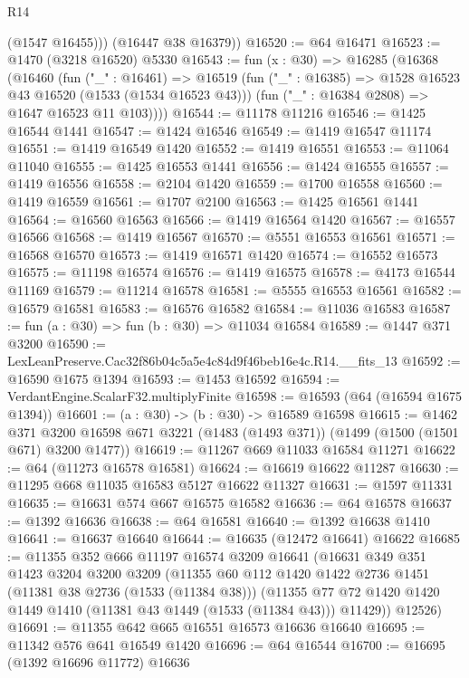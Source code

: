\begin{lexlean}{R14}
\begin{coremodule}
          (@1547 @16455)))
      (@16447 @38 @16379))
@16520 := @64 @16471
@16523 := @1470 (@3218 @16520) @5330
@16543 := fun (x : @30) =>
  @16285
    (@16368
      (@16460
        (fun ("_" : @16461) =>
        @16519
          (fun ("_" : @16385) => @1528 @16523 @43 @16520 (@1533 (@1534 @16523 @43)))
          (fun ("_" : @16384 @2808) => @1647 @16523 @11 @103))))
@16544 := @11178 @11216
@16546 := @1425 @16544 @1441
@16547 := @1424 @16546
@16549 := @1419 @16547 @11174
@16551 := @1419 @16549 @1420
@16552 := @1419 @16551
@16553 := @11064 @11040
@16555 := @1425 @16553 @1441
@16556 := @1424 @16555
@16557 := @1419 @16556
@16558 := @2104 @1420
@16559 := @1700 @16558
@16560 := @1419 @16559
@16561 := @1707 @2100
@16563 := @1425 @16561 @1441
@16564 := @16560 @16563
@16566 := @1419 @16564 @1420
@16567 := @16557 @16566
@16568 := @1419 @16567
@16570 := @5551 @16553 @16561
@16571 := @16568 @16570
@16573 := @1419 @16571 @1420
@16574 := @16552 @16573
@16575 := @11198 @16574
@16576 := @1419 @16575
@16578 := @4173 @16544 @11169
@16579 := @11214 @16578
@16581 := @5555 @16553 @16561
@16582 := @16579 @16581
@16583 := @16576 @16582
@16584 := @11036 @16583
@16587 := fun (a : @30) => fun (b : @30) => @11034 @16584
@16589 := @1447 @371 @3200
@16590 := LexLeanPreserve.Cac32f86b04c5a5e4c84d9f46beb16e4c.R14.__fits_13
@16592 := @16590 @1675 @1394
@16593 := @1453 @16592
@16594 := VerdantEngine.ScalarF32.multiplyFinite
@16598 := @16593 (@64 (@16594 @1675 @1394))
@16601 := (a : @30) -> (b : @30) -> @16589 @16598
@16615 := @1462
    @371
    @3200
    @16598
    @671
    @3221
    (@1483 (@1493 @371))
    (@1499 (@1500 (@1501 @671) @3200 @1477))
@16619 := @11267 @669 @11033 @16584 @11271
@16622 := @64 (@11273 @16578 @16581)
@16624 := @16619 @16622 @11287
@16630 := @11295 @668 @11035 @16583 @5127 @16622 @11327
@16631 := @1597 @11331
@16635 := @16631 @574 @667 @16575 @16582
@16636 := @64 @16578
@16637 := @1392 @16636
@16638 := @64 @16581
@16640 := @1392 @16638 @1410
@16641 := @16637 @16640
@16644 := @16635 (@12472 @16641) @16622
@16685 := @11355
    @352
    @666
    @11197
    @16574
    @3209
    @16641
    (@16631
      @349
      @351
      @1423
      @3204
      @3200
      @3209
      (@11355
        @60
        @112
        @1420
        @1422
        @2736
        @1451
        (@11381 @38 @2736 (@1533 (@11384 @38)))
        (@11355 @77 @72 @1420 @1420 @1449 @1410 (@11381 @43 @1449 (@1533 (@11384 @43))) @11429))
      @12526)
@16691 := @11355 @642 @665 @16551 @16573 @16636 @16640
@16695 := @11342 @576 @641 @16549 @1420
@16696 := @64 @16544
@16700 := @16695 (@1392 @16696 @11772) @16636

\end{coremodule}
\end{lexlean}
